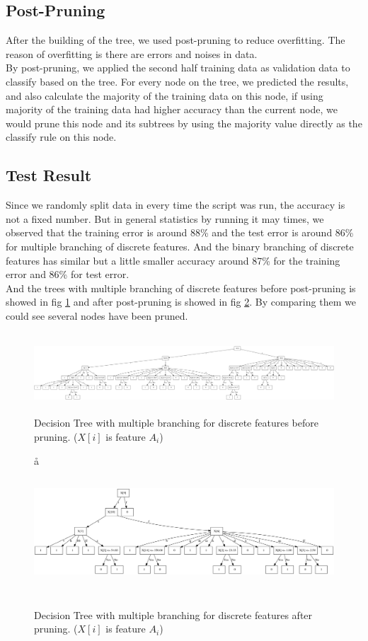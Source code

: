 \documentclass[11pt]{article}
\begin{document}
\subsection{Post-Pruning}
After the building of the tree, we used post-pruning to reduce overfitting. The reason of overfitting is there are errors and noises
in data. \\
By post-pruning, we applied the second half training data as validation data to classify based on the tree.
For every node on the tree, we predicted the results, and also calculate the majority of the training data on this node,
if using majority of the training data had higher accuracy than the current node, we would prune this node and its subtrees by using
the majority value directly as the classify rule on this node.

\subsection{Test Result}
Since we randomly split data in every time the script was run, the accuracy is not a fixed number. But in general statistics by running it may times,
we observed that the training error is around 88\% and the test error is around 86\% for multiple branching of discrete features. And the binary branching of discrete features has similar but a little smaller accuracy around 87\% for the training error and 86\% for test error.\\
And the trees with multiple branching of discrete features before post-pruning is showed in fig \ref{before} and after post-pruning is showed in fig \ref{after}. By comparing them we could see
several nodes have been pruned.

\begin{figure}[h!]
\centering
\includegraphics[height=1.18in, width=6.5in]{before.png}
\caption{Decision Tree with multiple branching for discrete features before pruning. ($X[i]$ is feature $A_i$)} 
\label{before}
\end{figure}

\begin{figure}[h!]å
\centering
\includegraphics[height=1.875in, width=6.5in]{after.png}
\caption{Decision Tree with multiple branching for discrete features after pruning. ($X[i]$ is feature $A_i$)}
\label{after}
\end{figure}
\end{document}
